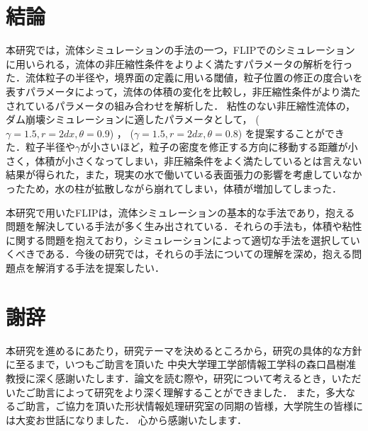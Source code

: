 \documentclass[a4j,12pt]{jreport}
\def\syaji{ \chapter*{謝辞} \addcontentsline{toc}{chapter}{謝辞}}
\begin{document}
\chapter{結論} \label{chapter:6}
本研究では，流体シミュレーションの手法の一つ，FLIPでのシミュレーションに用いられる，流体の非圧縮性条件をよりよく満たすパラメータの解析を行った．流体粒子の半径や，境界面の定義に用いる閾値，粒子位置の修正の度合いを表すパラメータによって，流体の体積の変化を比較し，非圧縮性条件がより満たされているパラメータの組み合わせを解析した．
粘性のない非圧縮性流体の，ダム崩壊シミュレーションに適したパラメータとして， ($\gamma = 1.5,r = 2dx,\theta = 0.9$) ， ($\gamma = 1.5,r = 2dx,\theta = 0.8$) を提案することができた．粒子半径や$\gamma$が小さいほど，粒子の密度を修正する方向に移動する距離が小さく，体積が小さくなってしまい，非圧縮条件をよく満たしているとは言えない結果が得られた，また，現実の水で働いている表面張力の影響を考慮していなかったため，水の柱が拡散しながら崩れてしまい，体積が増加してしまった．

本研究で用いたFLIPは，流体シミュレーションの基本的な手法であり，抱える問題を解決している手法が多く生み出されている．それらの手法も，体積や粘性に関する問題を抱えており，シミュレーションによって適切な手法を選択していくべきである．今後の研究では，それらの手法についての理解を深め，抱える問題点を解消する手法を提案したい．


\syaji
\par
本研究を進めるにあたり，研究テーマを決めるところから，研究の具体的な方針に至るまで，いつもご助言を頂いた
中央大学理工学部情報工学科の森口昌樹准教授に深く感謝いたします．論文を読む際や，研究について考えるとき，いただいたご助言によって研究をより深く理解することができました．
また，多大なるご助言，ご協力を頂いた形状情報処理研究室の同期の皆様，大学院生の皆様には大変お世話になりました．
心から感謝いたします．
\end{document}
